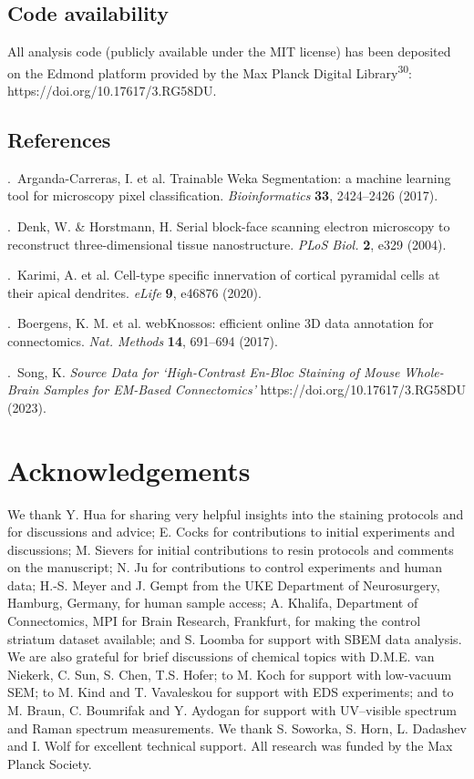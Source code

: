\documentclass{article}
\begin{document}
\subsection*{Code availability}
All analysis code (publicly available under the MIT license) has been deposited on the Edmond platform provided by the Max Planck Digital Library\textsuperscript{30}: https://doi.org/10.17617/3.RG58DU.

\subsection*{References}
.\ Arganda-Carreras, I. et al. Trainable Weka Segmentation: a machine learning tool for microscopy pixel classification. \emph{Bioinformatics} \textbf{33}, 2424–2426 (2017).\par
{}.\ Denk, W. \& Horstmann, H. Serial block-face scanning electron microscopy to reconstruct three-dimensional tissue nanostructure. \emph{PLoS Biol.} \textbf{2}, e329 (2004).\par
{}.\ Karimi, A. et al. Cell-type specific innervation of cortical pyramidal cells at their apical dendrites. \emph{eLife} \textbf{9}, e46876 (2020).\par
{}.\ Boergens, K. M. et al. webKnossos: efficient online 3D data annotation for connectomics. \emph{Nat. Methods} \textbf{14}, 691–694 (2017).\par
{}.\ Song, K. \emph{Source Data for ‘High-Contrast En-Bloc Staining of Mouse Whole-Brain Samples for EM-Based Connectomics’} https://doi.org/10.17617/3.RG58DU (2023).\par
\section*{Acknowledgements}
We thank Y. Hua for sharing very helpful insights into the staining protocols and for discussions and advice; E. Cocks for contributions to initial experiments and discussions; M. Sievers for initial contributions to resin protocols and comments on the manuscript; N. Ju for contributions to control experiments and human data; H.-S. Meyer and J. Gempt from the UKE Department of Neurosurgery, Hamburg, Germany, for human sample access; A. Khalifa, Department of Connectomics, MPI for Brain Research, Frankfurt, for making the control striatum dataset available; and S. Loomba for support with SBEM data analysis. We are also grateful for brief discussions of chemical topics with D.M.E. van Niekerk, C. Sun, S. Chen, T.S. Hofer; to M. Koch for support with low-vacuum SEM; to M. Kind and T. Vavaleskou for support with EDS experiments; and to M. Braun, C. Boumrifak and Y. Aydogan for support with UV–visible spectrum and Raman spectrum measurements. We thank S. Soworka, S. Horn, L. Dadashev and I. Wolf for excellent technical support. All research was funded by the Max Planck Society.
\end{document}
